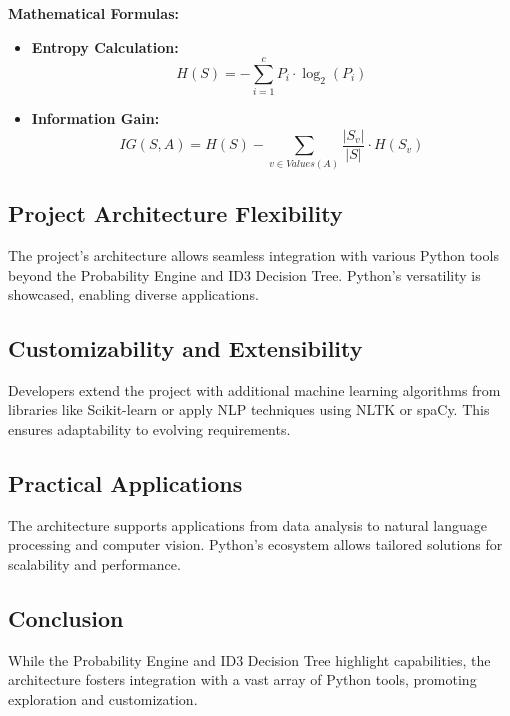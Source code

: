 \textbf{Mathematical Formulas:}
\begin{itemize}
    \item \textbf{Entropy Calculation:}
    \[
    H(S) = -\sum_{i=1}^{c} P_i \cdot \log_2(P_i)
    \]
    
    \item \textbf{Information Gain:}
    \[
    IG(S, A) = H(S) - \sum_{v \in Values(A)} \frac{|S_v|}{|S|} \cdot H(S_v)
    \]
%     
%     
\end{itemize}




\subsection*{Project Architecture Flexibility}

The project's architecture allows seamless integration with various Python tools beyond the Probability Engine and ID3 Decision Tree. Python's versatility is showcased, enabling diverse applications.

\subsection*{Customizability and Extensibility}

Developers extend the project with additional machine learning algorithms from libraries like Scikit-learn or apply NLP techniques using NLTK or spaCy. This ensures adaptability to evolving requirements.

\subsection*{Practical Applications}

The architecture supports applications from data analysis to natural language processing and computer vision. Python's ecosystem allows tailored solutions for scalability and performance.

\subsection*{Conclusion}

While the Probability Engine and ID3 Decision Tree highlight capabilities, the architecture fosters integration with a vast array of Python tools, promoting exploration and customization.
